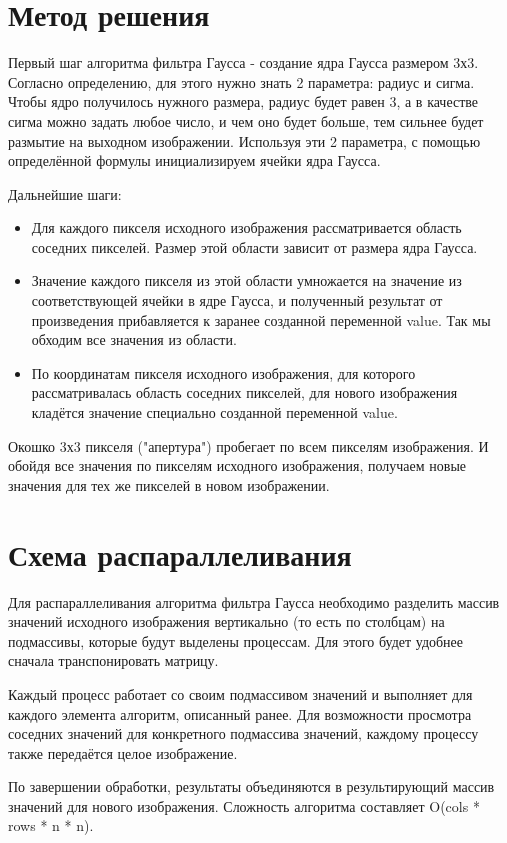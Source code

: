 \documentclass{report}
\begin{document}
\section*{Метод решения}
Первый шаг алгоритма фильтра Гаусса - создание ядра Гаусса размером 3х3. Согласно определению, для этого нужно знать 2 параметра: радиус и сигма. Чтобы ядро получилось нужного размера, радиус будет равен 3, а в качестве сигма можно задать любое число, и чем оно будет больше, тем сильнее будет размытие на выходном изображении. Используя эти 2 параметра, с помощью определённой формулы инициализируем ячейки ядра Гаусса.
\par Дальнейшие шаги:
\begin{itemize}
\item Для каждого пикселя исходного изображения рассматривается область соседних пикселей. Размер этой области зависит от размера ядра Гаусса.
\item Значение каждого пикселя из этой области умножается на значение из соответствующей ячейки в ядре Гаусса, и полученный результат от произведения прибавляется к заранее созданной переменной value. Так мы обходим все значения из области.
\item По координатам пикселя исходного изображения, для которого рассматривалась область соседних пикселей, для нового изображения кладётся значение специально созданной переменной value.
\end{itemize}
\par Окошко 3х3 пикселя ("апертура") пробегает по всем пикселям изображения. И обойдя все значения по пикселям исходного изображения, получаем новые значения для тех же пикселей в новом изображении.
\newpage

\section*{Схема распараллеливания}
Для распараллеливания алгоритма фильтра Гаусса необходимо разделить массив значений исходного изображения вертикально (то есть по столбцам) на подмассивы, которые будут выделены процессам. Для этого будет удобнее сначала транспонировать матрицу.
\par Каждый процесс работает со своим подмассивом значений и выполняет для каждого элемента алгоритм, описанный ранее. Для возможности просмотра соседних значений для конкретного подмассива значений, каждому процессу также передаётся целое изображение.
\par По завершении обработки, результаты объединяются в результирующий массив значений для нового изображения. Сложность алгоритма составляет O(cols * rows * n * n).
\newpage
\end{document}
